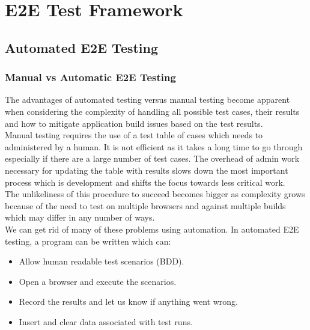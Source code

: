 \chapter{E2E Test Framework}
\label{chap:e2e-test-framework}

\section{Automated E2E Testing}
\label{sec:automated-e2e-testing}

\subsection{Manual vs Automatic E2E Testing}
\label{sec:manual-vs-automatic-e2e-testing}

The advantages of automated testing versus manual testing become apparent when considering the complexity of handling all possible test cases, their results and how to mitigate application build issues based on the test results. 
\\

Manual testing requires the use of a test table of cases which needs to administered by a human. It is not efficient as it takes a long time to go through especially if there are a large number of test cases. The overhead of admin work necessary for updating the table with results slows down the most important process which is development and shifts the focus towards less critical work.
\\

The unlikeliness of this procedure to succeed becomes bigger as complexity grows because of the need to test on multiple browsers and against multiple builds which may differ in any number of ways. 
\\

We can get rid of many of these problems using automation. In automated E2E testing, a program can be written which can:

\begin{itemize}
\item Allow human readable test scenarios (BDD).
\item Open a browser and execute the scenarios.
\item Record the results and let us know if anything went wrong.
\item Insert and clear data associated with test runs.
\end{itemize}


